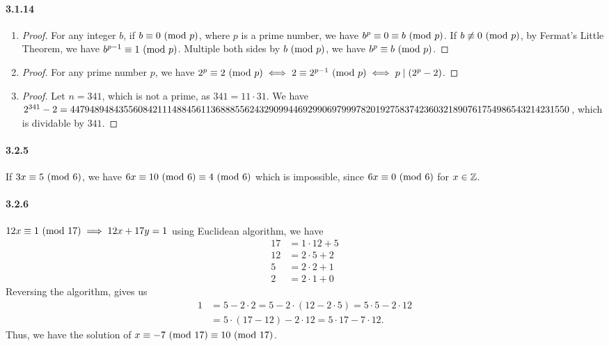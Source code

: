 \documentclass[8pt,twocolumn]{article}
\begin{document}
\paragraph{3.1.14}
\begin{enumerate}
  \item \begin{proof}
      For any integer $b$, if $b\equiv 0\ (\mathrm{mod}\ p)$, where $p$ is a prime number, we
      have $b^p\equiv0\equiv b\ (\mathrm{mod}\ p)$. If $b\not\equiv 0\ (\mathrm{mod}\ p)$, by Fermat's Little Theorem,
      we have $b^{p-1}\equiv 1\ (\mathrm{mod}\ p)$. Multiple both sides by $b\ (\mathrm{mod}\ p)$, we have
      $b^{p}\equiv b\ (\mathrm{mod}\ p)$.
  \end{proof}
  \item \begin{proof}
      For any prime number $p$, we have
      $2^{p}\equiv 2\ (\mathrm{mod}\ p)\iff 2\equiv2^{p-1}\ (\mathrm{mod}\ p)\iff p\mid (2^p-2)$.
  \end{proof}
  \item \begin{proof}
    Let $n=341$, which is not a prime, as $341=11\cdot31$. We have
    $2^{341}-2=4479489484355608421114884561136\\
              8885562432909944692990697999782019275837423603218\\
              90761754986543214231550$, which is dividable by $341$.
  \end{proof}
\end{enumerate}

\paragraph{3.2.5}
If $3x\equiv 5\ (\mathrm{mod}\ 6)$, we have $6x\equiv 10\ (\mathrm{mod}\ 6)\equiv 4\ (\mathrm{mod}\ 6)$ which is impossible, since
$6x\equiv 0\ (\mathrm{mod}\ 6)$ for $x\in\mathbb{Z}$.

\paragraph{3.2.6}
$12x\equiv1\ (\mathrm{mod}\ 17)\implies 12x+17y=1$ using Euclidean algorithm, we have
\begin{align*}
  17 &= 1\cdot 12 + 5 \\
  12 &= 2\cdot 5  + 2 \\
  5  &= 2\cdot 2  + 1 \\
  2  &= 2\cdot 1  + 0
\end{align*}
Reversing the algorithm, gives us
\begin{align*}
  1 &= 5 - 2\cdot 2 = 5 - 2\cdot(12 - 2\cdot5) = 5\cdot 5 - 2\cdot 12\\
  &= 5\cdot (17-12) - 2\cdot 12 = 5\cdot 17 - 7\cdot 12.
\end{align*}
Thus, we have the solution of $x\equiv -7\ (\mathrm{mod}\ 17)\equiv10\ (\mathrm{mod}\ 17)$.
\end{document}
